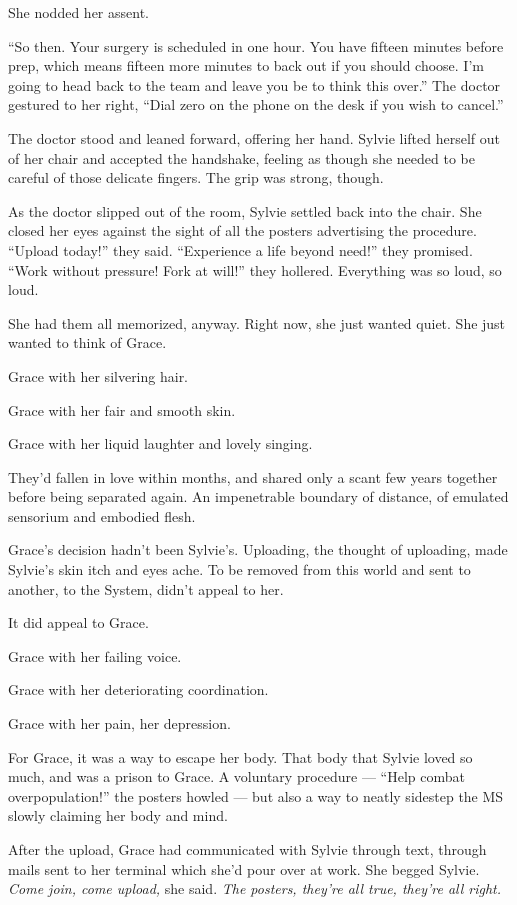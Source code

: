 She nodded her assent.

``So then. Your surgery is scheduled in one hour. You have fifteen minutes before prep, which means fifteen more minutes to back out if you should choose. I'm going to head back to the team and leave you be to think this over.'' The doctor gestured to her right, ``Dial zero on the phone on the desk if you wish to cancel.''

The doctor stood and leaned forward, offering her hand. Sylvie lifted herself out of her chair and accepted the handshake, feeling as though she needed to be careful of those delicate fingers. The grip was strong, though.

As the doctor slipped out of the room, Sylvie settled back into the chair. She closed her eyes against the sight of all the posters advertising the procedure. ``Upload today!'' they said. ``Experience a life beyond need!'' they promised. ``Work without pressure! Fork at will!'' they hollered. Everything was so loud, so loud.

She had them all memorized, anyway. Right now, she just wanted quiet. She just wanted to think of Grace.

Grace with her silvering hair.

Grace with her fair and smooth skin.

Grace with her liquid laughter and lovely singing.

They'd fallen in love within months, and shared only a scant few years together before being separated again. An impenetrable boundary of distance, of emulated sensorium and embodied flesh.

Grace's decision hadn't been Sylvie's. Uploading, the thought of uploading, made Sylvie's skin itch and eyes ache. To be removed from this world and sent to another, to the System, didn't appeal to her.

It did appeal to Grace.

Grace with her failing voice.

Grace with her deteriorating coordination.

Grace with her pain, her depression.

For Grace, it was a way to escape her body. That body that Sylvie loved so much, and was a prison to Grace. A voluntary procedure --- ``Help combat overpopulation!'' the posters howled --- but also a way to neatly sidestep the MS slowly claiming her body and mind.

After the upload, Grace had communicated with Sylvie through text, through mails sent to her terminal which she'd pour over at work. She begged Sylvie. \emph{Come join, come upload,} she said. \emph{The posters, they're all true, they're all right.}

